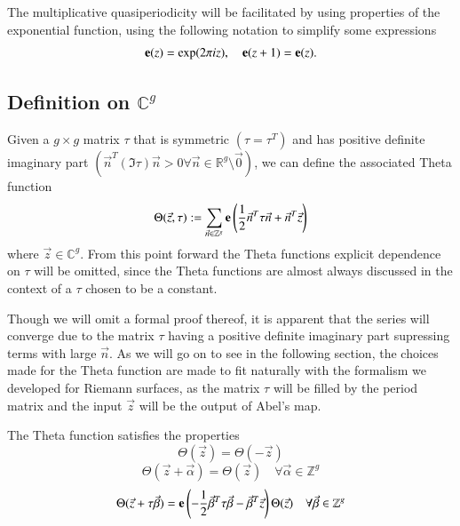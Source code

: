 The multiplicative quasiperiodicity will be facilitated by using properties of the exponential function, using the following notation to simplify some expressions
\begin{equation}
    \mathbf{e}(z) = \exp(2\pi i z), \quad \mathbf{e}(z+1)=\mathbf{e}(z).
\end{equation}

\subsection{Definition on $\mathbb C^g$}

\begin{definition}
    Given a $g \times g$ matrix $\tau$ that is symmetric $(\tau = \tau^T)$ and has positive definite imaginary part $(\vec n^T (\Im \tau) \vec n > 0 \forall \vec n \in \mathbb R^g \setminus \vec 0)$, we can define the associated Theta function
    \begin{equation} \label{eqnB12:ThetaGeneralDefn}
        \Theta(\vec z,\tau) := \sum_{\vec n \in \mathbb Z^g} \mathbf{e}\left(\frac{1}{2} \vec n^T \tau \vec n + \vec n^T \vec z\right)
    \end{equation}
    where $\vec z \in \mathbb C^g$. From this point forward the Theta functions explicit dependence on $\tau$ will be omitted, since the Theta functions are almost always discussed in the context of a $\tau$ chosen to be a constant.
\end{definition}

Though we will omit a formal proof thereof, it is apparent that the series will converge due to the matrix $\tau$ having a positive definite imaginary part supressing terms with large $\vec n$. As we will go on to see in the following section, the choices made for the Theta function are made to fit naturally with the formalism we developed for Riemann surfaces, as the matrix $\tau$ will be filled by the period matrix and the input $\vec z$ will be the output of Abel's map.

\begin{lemma}
    \label{lemmaB12:ThetaGeneralProperties}
    The Theta function satisfies the properties
    \begin{equation} \label{eqnB12:ThetaGeneralEven}
        \Theta(\vec z) = \Theta(-\vec z)
    \end{equation}
    \begin{equation} \label{eqnB12:ThetaGeneralShift}
        \Theta(\vec z+\vec \alpha) = \Theta(\vec z) \quad \forall \vec \alpha \in \mathbb Z^g
    \end{equation}
    \begin{equation} \label{eqnB12:ThetaGeneralTauShift}
        \Theta(\vec z + \tau \vec \beta) = \mathbf{e}\left(-\frac{1}{2}\vec \beta^T \tau \vec \beta - \vec \beta^T \vec z\right) \Theta(\vec z) \quad \forall \vec \beta \in \mathbb Z^g
    \end{equation}
\end{lemma}

